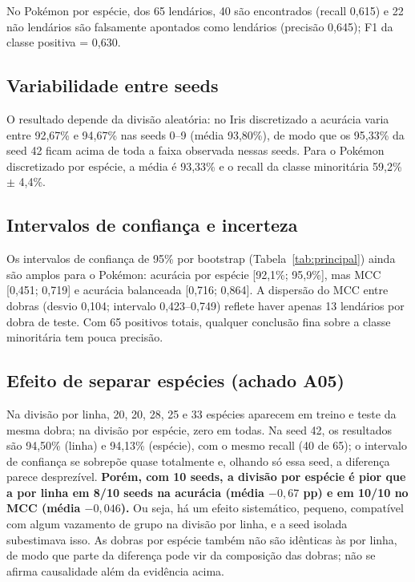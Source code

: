 \documentclass[a4paper,11pt]{article}
\begin{document}
No Pok\'emon por esp\'ecie, dos 65 lend\'arios, 40 s\~ao encontrados (recall 0,615) e 22 n\~ao lend\'arios s\~ao falsamente apontados como lend\'arios (precis\~ao 0,645); F1 da classe positiva = 0,630.

\subsection{Variabilidade entre seeds}

O resultado depende da divis\~ao aleat\'oria: no Iris discretizado a acur\'acia varia entre 92,67\% e 94,67\% nas seeds 0--9 (m\'edia 93,80\%), de modo que os 95,33\% da seed 42 ficam acima de toda a faixa observada nessas seeds. Para o Pok\'emon discretizado por esp\'ecie, a m\'edia \'e 93,33\% e o recall da classe minorit\'aria 59,2\% $\pm$ 4,4\%.

\subsection{Intervalos de confian\c{c}a e incerteza}
Os intervalos de confian\c{c}a de 95\% por bootstrap (Tabela~\ref{tab:principal}) ainda s\~ao amplos para o Pok\'emon: acur\'acia por esp\'ecie [92,1\%; 95,9\%], mas MCC [0,451; 0,719] e acur\'acia balanceada [0,716; 0,864]. A dispers\~ao do MCC entre dobras (desvio 0,104; intervalo 0,423--0,749) reflete haver apenas 13 lend\'arios por dobra de teste. Com 65 positivos totais, qualquer conclus\~ao fina sobre a classe minorit\'aria tem pouca precis\~ao.

\subsection{Efeito de separar esp\'ecies (achado A05)}




Na divis\~ao por linha, 20, 20, 28, 25 e 33 esp\'ecies aparecem em treino e teste da mesma dobra; na divis\~ao por esp\'ecie, zero em todas. Na seed 42, os resultados s\~ao 94,50\% (linha) e 94,13\% (esp\'ecie), com o mesmo recall (40 de 65); o intervalo de confian\c{c}a se sobrep\~oe quase totalmente e, olhando s\'o essa seed, a diferen\c{c}a parece desprez\'ivel. \textbf{Por\'em, com 10 seeds, a divis\~ao por esp\'ecie \'e pior que a por linha em 8/10 seeds na acur\'acia (m\'edia $-0{,}67$ pp) e em 10/10 no MCC (m\'edia $-0{,}046$).} Ou seja, h\'a um efeito sistem\'atico, pequeno, compat\'ivel com algum vazamento de grupo na divis\~ao por linha, e a seed isolada subestimava isso. As dobras por esp\'ecie tamb\'em n\~ao s\~ao id\^enticas \`as por linha, de modo que parte da diferen\c{c}a pode vir da composi\c{c}\~ao das dobras; n\~ao se afirma causalidade al\'em da evid\^encia acima.
\end{document}
